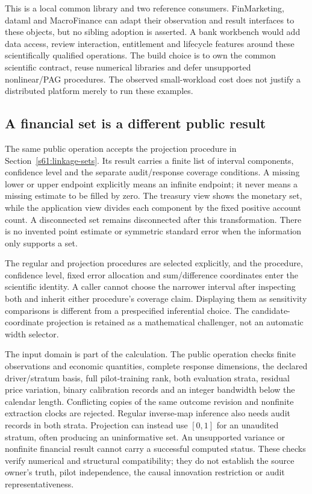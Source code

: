 This is a local common library and two reference consumers. FinMarketing,
dataml and MacroFinance can adapt their observation and result interfaces
to these objects, but no sibling adoption is asserted. A bank workbench
would add data access, review interaction, entitlement and lifecycle
features around these scientifically qualified operations. The build choice
is to own the common scientific contract, reuse numerical libraries and
defer unsupported nonlinear/PAG procedures. The observed small-workload
cost does not justify a distributed platform merely to run these examples.

\subsection{A financial set is a different public result}
\label{s61:projection-product}
The same public operation accepts the projection procedure in
Section~\ref{s61:linkage-sets}. Its result carries a finite list of interval
components, confidence level and the separate audit/response coverage
conditions. A missing lower or upper endpoint explicitly means an infinite
endpoint; it never means a missing estimate to be filled by zero. The treasury
view shows the monetary set, while the application view divides each
component by the fixed positive account count. A disconnected set remains
disconnected after this transformation. There is no invented point estimate
or symmetric standard error when the information only supports a set.

The regular and projection procedures are selected explicitly, and the
procedure, confidence level, fixed error allocation and sum/difference
coordinates enter the scientific identity. A caller cannot choose the
narrower interval after inspecting both and inherit either procedure's
coverage claim. Displaying them as sensitivity comparisons is different
from a prespecified inferential choice. The candidate-coordinate projection
is retained as a mathematical challenger, not an automatic width selector.

The input domain is part of the calculation. The public operation checks
finite observations and economic quantities, complete response dimensions,
the declared driver/stratum basis, full pilot-training rank, both evaluation
strata, residual price variation, binary calibration records and an integer
bandwidth below the calendar length. Conflicting copies of the same outcome
revision and nonfinite extraction clocks are rejected. Regular inverse-map
inference also needs audit records in both strata. Projection can instead
use $[0,1]$ for an unaudited stratum, often producing an uninformative set.
An unsupported variance or nonfinite financial result cannot carry a
successful computed status. These checks verify numerical and structural
compatibility; they do not establish the source owner's truth, pilot
independence, the causal innovation restriction or audit representativeness.

